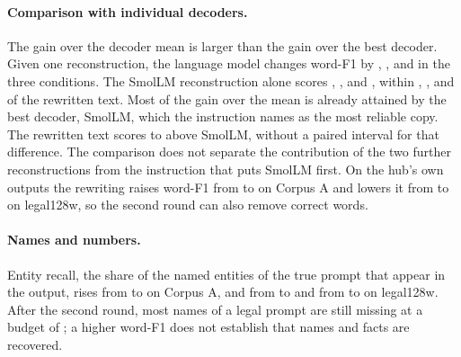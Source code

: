 \paragraph{Comparison with individual decoders.} The gain over the decoder mean is larger than the gain over the best decoder.
Given one reconstruction, the language model changes word-F1 by , , and  in the three conditions. %
The SmolLM reconstruction alone scores , , and , within , , and  of the rewritten text. %
Most of the gain over the mean is already attained by the best decoder, SmolLM, which the instruction names as the most reliable copy.
The rewritten text scores  to  above SmolLM, without a paired interval for that difference.
The comparison does not separate the contribution of the two further reconstructions from the instruction that puts SmolLM first.
On the hub's own outputs the rewriting raises word-F1 from  to  on Corpus A and lowers it from  to  on legal128w, so the second round can also remove correct words. %

\paragraph{Names and numbers.} Entity recall, the share of the named entities of the true prompt that appear in the output, rises from  to  on Corpus A, and from  to  and from  to  on legal128w. %
After the second round, most names of a legal prompt are still missing at a budget of ; a higher word-F1 does not establish that names and facts are recovered.

